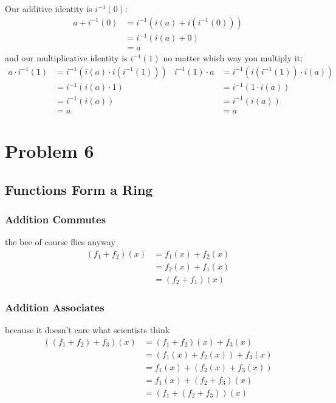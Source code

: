 \documentclass[12pt]{article}
\begin{document}
Our additive identity is $i^{-1}(0)$:
\begin{align*}
  a + i^{-1}(0)
   & = i^{-1}(i(a) + i(i^{-1}(0))) \\
   & = i^{-1}(i(a) + 0)            \\
   & = a
\end{align*}
and our multiplicative identity is $i^{-1}(1)$ no matter which way you multiply it:
\begin{align*}
  a \cdot i^{-1}(1) & = i^{-1}(i(a) \cdot i(i^{-1}(1))) & i^{-1}(1) \cdot a & = i^{-1}(i(i^{-1}(1)) \cdot i(a)) \\
                    & = i^{-1}(i(a) \cdot 1)            &                   & = i^{-1}(1 \cdot i(a))            \\
                    & = i^{-1}(i(a))                    &                   & = i^{-1}(i(a))                    \\
                    & = a                               &                   & = a
\end{align*}

\pagebreak

\section{Problem 6}

\subsection{Functions Form a Ring}

\subsubsection{Addition Commutes}

the bee of course flies anyway
\begin{align*}
  (f_1+f_2)(x)
   & = f_1(x)+f_2(x) \\
   & = f_2(x)+f_1(x) \\
   & = (f_2+f_1)(x)
\end{align*}

\subsubsection{Addition Associates}

because it doesn't care what scientists think
\begin{align*}
  ((f_1+f_2)+f_3)(x)
   & = (f_1+f_2)(x)+f_3(x)    \\
   & = (f_1(x)+f_2(x))+f_3(x) \\
   & = f_1(x)+(f_2(x)+f_3(x)) \\
   & = f_1(x)+(f_2+f_3)(x)    \\
   & = (f_1+(f_2+f_3))(x)
\end{align*}
\end{document}
